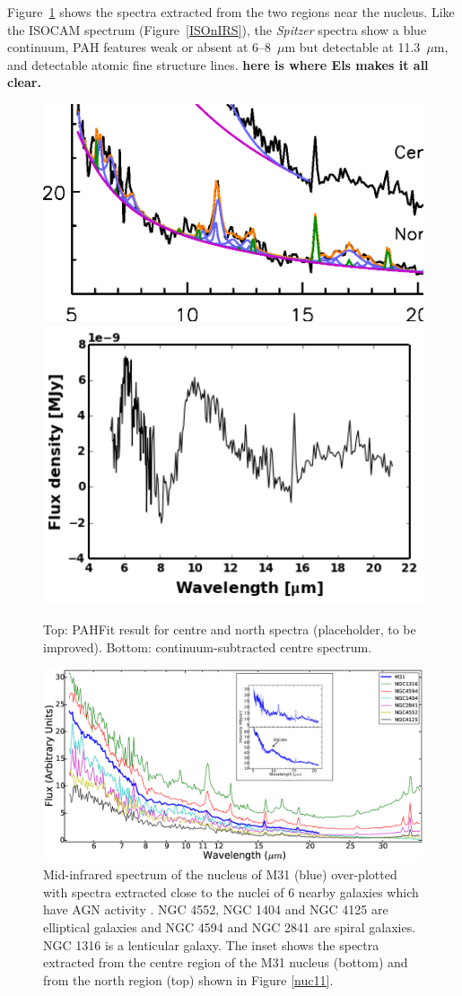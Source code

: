 Figure~\ref{fig:nuc_detail} shows the spectra extracted from the two regions near the nucleus.
Like the ISOCAM spectrum (Figure~\ref{ISOnIRS}), the  {\em Spitzer} spectra show a blue
continuum, PAH features weak or absent at 6--8~$\mu$m  but detectable at 11.3~$\mu$m, and detectable atomic fine structure lines.
{\bf here is where Els makes it all clear.}

\begin{figure}
\centering
\includegraphics[width = 8 cm]{./fig_sp_m31_nucleus.eps}
\includegraphics[width = 8 cm]{./nuc_ctr_contsub.pdf}
\caption{Top: PAHFit result for centre and north spectra (placeholder, to be improved).
Bottom: continuum-subtracted centre spectrum.}
\label{fig:nuc_detail}
\end{figure}


\begin{figure}
\centering
\includegraphics[height = 8 cm]{./SINGSspec.eps}
\caption{Mid-infrared spectrum of the nucleus of M31 (blue) over-plotted with spectra extracted close to the nuclei of 6 nearby galaxies which have 
AGN activity \citep{Smith:2007lr}. NGC 4552, NGC 1404 and NGC 4125 are elliptical galaxies and NGC 4594 and NGC 2841 are spiral galaxies. 
NGC 1316 is a lenticular galaxy. The inset shows the spectra extracted from the centre region of the M31 nucleus (bottom) and from the north region (top) 
shown in Figure \ref{nuc11}.}
\label{smithspec}
\end{figure}

